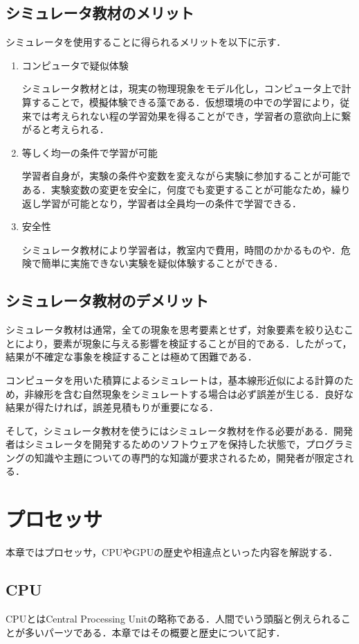 \documentclass[a4j,12pt]{jsarticle}
\begin{document}
\subsection{シミュレータ教材のメリット}
シミュレータを使用することに得られるメリットを以下に示す．
\begin{enumerate}
\item コンピュータで疑似体験

シミュレータ教材とは，現実の物理現象をモデル化し，コンピュータ上で計算することで，模擬体験できる藻である．仮想環境の中での学習により，従来では考えられない程の学習効果を得ることができ，学習者の意欲向上に繋がると考えられる．
\item 等しく均一の条件で学習が可能

学習者自身が，実験の条件や変数を変えながら実験に参加することが可能である．実験変数の変更を安全に，何度でも変更することが可能なため，繰り返し学習が可能となり，学習者は全員均一の条件で学習できる．
\item 安全性

シミュレータ教材により学習者は，教室内で費用，時間のかかるものや．危険で簡単に実施できない実験を疑似体験することができる．
\end{enumerate}

\subsection{シミュレータ教材のデメリット}
シミュレータ教材は通常，全ての現象を思考要素とせず，対象要素を絞り込むことにより，要素が現象に与える影響を検証することが目的である．したがって，結果が不確定な事象を検証することは極めて困難である．

コンピュータを用いた積算によるシミュレートは，基本線形近似による計算のため，非線形を含む自然現象をシミュレートする場合は必ず誤差が生じる．良好な結果が得たければ，誤差見積もりが重要になる．

そして，シミュレータ教材を使うにはシミュレータ教材を作る必要がある．開発者はシミュレータを開発するためのソフトウェアを保持した状態で，プログラミングの知識や主題についての専門的な知識が要求されるため，開発者が限定される．
\newpage
\section{プロセッサ}
本章ではプロセッサ，CPUやGPUの歴史や相違点といった内容を解説する．
\subsection{CPU}
CPUとはCentral Processing Unitの略称である．人間でいう頭脳と例えられることが多いパーツである．本章ではその概要と歴史について記す．
\end{document}

